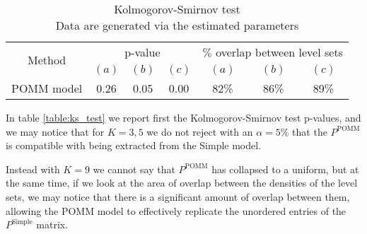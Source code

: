 \documentclass[11pt]{amsart}
\begin{document}
\begin{table}[htbp]
\centering
\caption{
{\large Kolmogorov-Smirnov test} \\ 
{\small Data are generated via the estimated parameters}
} 
\begin{tabular}{ccccccc}
\toprule
\multirow{2}{*}{Method} & \multicolumn{3}{c}{
p-value} & \multicolumn{3}{c}{
$\%$ overlap between level sets} \\
\cmidrule(lr){2-4} \cmidrule(lr){5-7}
& $(a)$ & $(b)$ & $(c)$ & $(a)$ & $(b)$ & $(c)$  \\
\midrule
POMM model  &0.26& 0.05 & 0.00 & 82\% & 86\% & 89\% \\
\bottomrule
\end{tabular}
\label{table:ks_test}
\end{table}

In table \eqref{table:ks_test} we report first the Kolmogorov-Smirnov test p-values, and we may notice that for $K=3,5$ we do not reject with an $\alpha = 5\%$ that the $P^{\text{POMM}}$ is compatible with being extracted from the Simple model.

Instead with $K=9$ we cannot say that $P^{\text{POMM}}$ has collapsed to a uniform, but at the same time, if we look at the area of overlap between the densities of the level sets, we may notice that there is a significant amount of overlap between them, allowing the POMM model to effectively replicate the unordered entries of the $P^{\text{Simple}}$ matrix.
\end{document}
